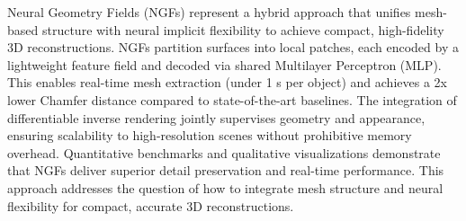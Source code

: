 Neural Geometry Fields (NGFs) represent a hybrid approach that unifies mesh-based structure with neural implicit flexibility to achieve compact, high-fidelity 3D reconstructions.  
NGFs partition surfaces into local patches, each encoded by a lightweight feature field and decoded via shared Multilayer Perceptron (MLP).  
This enables real-time mesh extraction (under 1 s per object) and achieves a 2x lower Chamfer distance compared to state-of-the-art baselines.  
The integration of differentiable inverse rendering jointly supervises geometry and appearance, ensuring scalability to high-resolution scenes without prohibitive memory overhead.  
Quantitative benchmarks and qualitative visualizations demonstrate that NGFs deliver superior detail preservation and real-time performance.  
This approach addresses the question of how to integrate mesh structure and neural flexibility for compact, accurate 3D reconstructions.  
